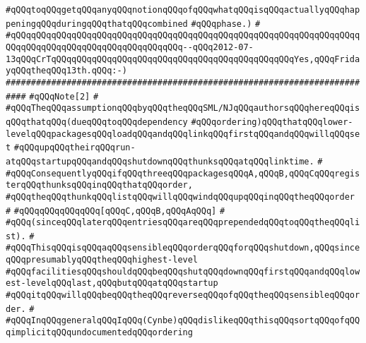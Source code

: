 \verb|#qQQqtoqQQqgetqQQqanyqQQqnotionqQQqofqQQqwhatqQQqisqQQqactuallyqQQqhappeningqQQqduringqQQqthatqQQqcombined|\newline
\verb|#qQQqphase.)|\newline
\verb|#|\newline
\verb|#qQQqqQQqqQQqqQQqqQQqqQQqqQQqqQQqqQQqqQQqqQQqqQQqqQQqqQQqqQQqqQQqqQQqqQQqqQQqqQQqqQQqqQQqqQQqqQQqqQQqqQQq--qQQq2012-07-13qQQqCrTqQQqqQQqqQQqqQQqqQQqqQQqqQQqqQQqqQQqqQQqqQQqqQQqYes,qQQqFridayqQQqtheqQQq13th.qQQq:-)|\newline
\newline
\verb|##########################################################################|\newline
\verb|#qQQqNote[2]|\newline
\verb|#|\newline
\verb|#qQQqTheqQQqassumptionqQQqbyqQQqtheqQQqSML/NJqQQqauthorsqQQqhereqQQqisqQQqthatqQQq(dueqQQqtoqQQqdependency|\newline
\verb|#qQQqordering)qQQqthatqQQqlower-levelqQQqpackagesqQQqloadqQQqandqQQqlinkqQQqfirstqQQqandqQQqwillqQQqset|\newline
\verb|#qQQqupqQQqtheirqQQqrun-atqQQqstartupqQQqandqQQqshutdownqQQqthunksqQQqatqQQqlinktime.|\newline
\verb|#|\newline
\verb|#qQQqConsequentlyqQQqifqQQqthreeqQQqpackagesqQQqA,qQQqB,qQQqCqQQqregisterqQQqthunksqQQqinqQQqthatqQQqorder,|\newline
\verb|#qQQqtheqQQqthunkqQQqlistqQQqwillqQQqwindqQQqupqQQqinqQQqtheqQQqorder|\newline
\verb|#|\newline
\verb|#qQQqqQQqqQQqqQQq[qQQqC,qQQqB,qQQqAqQQq]|\newline
\verb|#|\newline
\verb|#qQQq(sinceqQQqlaterqQQqentriesqQQqareqQQqprependedqQQqtoqQQqtheqQQqlist).|\newline
\verb|#|\newline
\verb|#qQQqThisqQQqisqQQqaqQQqsensibleqQQqorderqQQqforqQQqshutdown,qQQqsinceqQQqpresumablyqQQqtheqQQqhighest-level|\newline
\verb|#qQQqfacilitiesqQQqshouldqQQqbeqQQqshutqQQqdownqQQqfirstqQQqandqQQqlowest-levelqQQqlast,qQQqbutqQQqatqQQqstartup|\newline
\verb|#qQQqitqQQqwillqQQqbeqQQqtheqQQqreverseqQQqofqQQqtheqQQqsensibleqQQqorder.|\newline
\verb|#|\newline
\verb|#qQQqInqQQqgeneralqQQqIqQQq(Cynbe)qQQqdislikeqQQqthisqQQqsortqQQqofqQQqimplicitqQQqundocumentedqQQqordering|\newline
